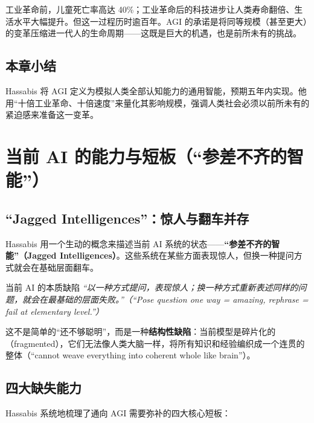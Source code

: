 \documentclass[a4paper]{article}
\begin{document}
工业革命前，儿童死亡率高达 40\%；工业革命后的科技进步让人类寿命翻倍、生活水平大幅提升。但这一过程历时逾百年。AGI 的承诺是将同等规模（甚至更大）的变革压缩进一代人的生命周期——这既是巨大的机遇，也是前所未有的挑战。

\subsection{本章小结}

Hassabis 将 AGI 定义为模拟人类全部认知能力的通用智能，预期五年内实现。他用``十倍工业革命、十倍速度''来量化其影响规模，强调人类社会必须以前所未有的紧迫感来准备这一变革。

\section{当前 AI 的能力与短板（``参差不齐的智能''）}

\subsection{``Jagged Intelligences''：惊人与翻车并存}

Hassabis 用一个生动的概念来描述当前 AI 系统的状态——\textbf{``参差不齐的智能''（Jagged Intelligences）}。这些系统在某些方面表现惊人，但换一种提问方式就会在基础层面翻车。

\begin{warningbox}{当前 AI 的本质缺陷}
\textit{``以一种方式提问，表现惊人；换一种方式重新表述同样的问题，就会在最基础的层面失败。''（``Pose question one way = amazing, rephrase = fail at elementary level.''）}

这不是简单的``还不够聪明''，而是一种\textbf{结构性缺陷}：当前模型是碎片化的（fragmented），它们无法像人类大脑一样，将所有知识和经验编织成一个连贯的整体（``cannot weave everything into coherent whole like brain''）。
\end{warningbox}

\subsection{四大缺失能力}

Hassabis 系统地梳理了通向 AGI 需要弥补的四大核心短板：
\end{document}
